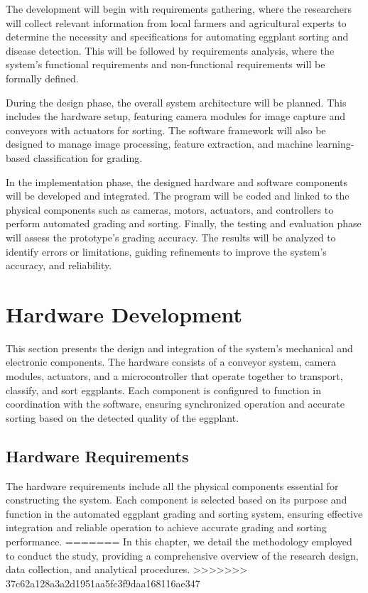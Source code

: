 {The development will begin with requirements gathering, where the researchers will collect relevant information from local farmers and agricultural experts to determine the necessity and specifications for automating eggplant sorting and disease detection.  This will be followed by requirements analysis, where the system’s functional requirements and non-functional requirements will be formally defined.

During the design phase, the overall system architecture will be planned. This includes the hardware setup, featuring camera modules for image capture and conveyors with actuators for sorting. The software framework will also be designed to manage image processing, feature extraction, and machine learning-based classification for grading.

In the implementation phase, the designed hardware and software components will be developed and integrated. The program will be coded and linked to the physical components such as cameras, motors, actuators, and controllers to perform automated grading and sorting. Finally, the testing and evaluation phase will assess the prototype's grading accuracy. The results will be analyzed to identify errors or limitations, guiding refinements to improve the system’s accuracy, and reliability.

\section{Hardware Development}
This section presents the design and integration of the system’s mechanical and electronic components. The hardware consists of a conveyor system, camera modules, actuators, and a microcontroller that operate together to transport, classify, and sort eggplants. Each component is configured to function in coordination with the software, ensuring synchronized operation and accurate sorting based on the detected quality of the eggplant. 

\subsection{Hardware Requirements}
The hardware requirements include all the physical components essential for constructing the system. Each component is selected based on its purpose and function in the automated eggplant grading and sorting system, ensuring effective integration and reliable operation to achieve accurate grading and sorting performance.
=======
In this chapter, we detail the methodology employed to conduct the study, providing a comprehensive overview of the research design, data collection, and analytical procedures.
>>>>>>> 37c62a128a3a2d1951aa5fc3f9daa168116ae347

}
